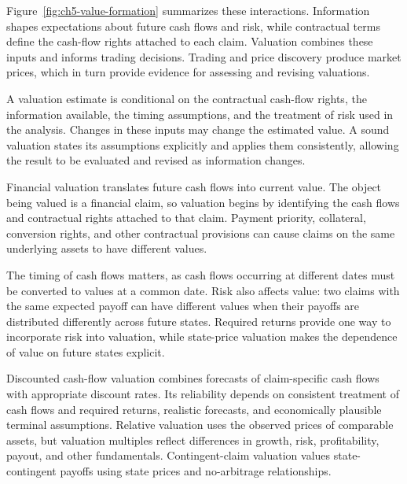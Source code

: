 Figure~\ref{fig:ch5-value-formation} summarizes these interactions. Information shapes expectations about future cash flows and risk, while contractual terms define the cash-flow rights attached to each claim. Valuation combines these inputs and informs trading decisions. Trading and price discovery produce market prices, which in turn provide evidence for assessing and revising valuations.

\begin{tcolorbox}[
  enhanced,
  breakable,
  colback=white,
  colframe=FinanceBlue,
  boxrule=0.7pt,
  sharp corners,
  borderline west={2.2pt}{0pt}{FinanceBlue},
  title={Financial Perspective: Valuation as a Conditional Statement},
  coltitle=white,
  colbacktitle=FinanceBlue,
  fonttitle=\bfseries,
  before skip=1.2em,
  after skip=1.2em
]

A valuation estimate is conditional on the contractual cash-flow rights, the information available, the timing assumptions, and the treatment of risk used in the analysis. Changes in these inputs may change the estimated value. A sound valuation states its assumptions explicitly and applies them consistently, allowing the result to be evaluated and revised as information changes.

\end{tcolorbox}



Financial valuation translates future cash flows into current value. The object being valued is a financial claim, so valuation begins by identifying the cash flows and contractual rights attached to that claim. Payment priority, collateral, conversion rights, and other contractual provisions can cause claims on the same underlying assets to have different values.

The timing of cash flows matters, as cash flows occurring at different dates must be converted to values at a common date. Risk also affects value: two claims with the same expected payoff can have different values when their payoffs are distributed differently across future states. Required returns provide one way to incorporate risk into valuation, while state-price valuation makes the dependence of value on future states explicit.

Discounted cash-flow valuation combines forecasts of claim-specific cash flows with appropriate discount rates. Its reliability depends on consistent treatment of cash flows and required returns, realistic forecasts, and economically plausible terminal assumptions. Relative valuation uses the observed prices of comparable assets, but valuation multiples reflect differences in growth, risk, profitability, payout, and other fundamentals. Contingent-claim valuation values state-contingent payoffs using state prices and no-arbitrage relationships.

